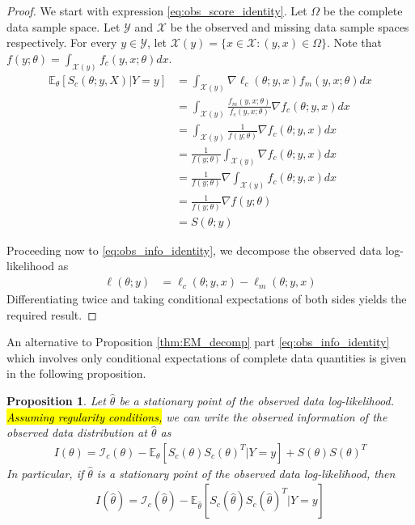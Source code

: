\documentclass[11pt, oneside]{article}   	%
\newcommand{\bE}{\mathbb{E}}
\newtheorem{proposition}{Proposition}[section]
\begin{document}
\begin{proof}
    We start with expression \ref{eq:obs_score_identity}. Let $\Omega$ be the complete data sample space. Let $\mathcal{Y}$ and $\mathcal{X}$ be the observed and missing data sample spaces respectively. For every $y \in \mathcal{Y}$, let $\mathcal{X}(y) = \{ x \in \mathcal{X}: (y,x) \in \Omega\}$. Note that $f(y; \theta) = \int_{\mathcal{X}(y)} f_c(y, x; \theta) dx$.
    \begin{align}
        \bE_\theta [S_c(\theta; y, X)|Y=y] &= \int_{\mathcal{X}(y)} \nabla \ell_c(\theta; y, x) f_m(y, x; \theta) dx \nonumber\\
        &= \int_{\mathcal{X}(y)} \frac{f_m(y, x; \theta)}{f_c(y, x; \theta)} \nabla f_c(\theta; y, x) dx \nonumber\\
        &= \int_{\mathcal{X}(y)} \frac{1}{f(y; \theta)} \nabla f_c(\theta; y, x) dx\nonumber\\
        &= \frac{1}{f(y; \theta)} \int_{\mathcal{X}(y)} \nabla f_c(\theta; y, x) dx\nonumber\\
        &= \frac{1}{f(y; \theta)} \nabla \int_{\mathcal{X}(y)} f_c(\theta; y, x) dx \nonumber\\
        &= \frac{1}{f(y; \theta)} \nabla f(y; \theta)\nonumber\\
        &= S(\theta; y) \nonumber
    \end{align}

    Proceeding now to \ref{eq:obs_info_identity}, we decompose the observed data log-likelihood as
    \begin{align*}
        \ell(\theta; y) &= \ell_c(\theta; y, x) - \ell_m(\theta; y, x)
    \end{align*}
    Differentiating twice and taking conditional expectations of both sides yields the required result.
\end{proof}

An alternative to Proposition \ref{thm:EM_decomp} part \ref{eq:obs_info_identity} which involves only conditional expectations of complete data quantities is given in the following proposition.

\begin{proposition}
    \label{thm:info_decomp}
    Let $\hat{\theta}$ be a stationary point of the observed data log-likelihood. \hl{Assuming regularity conditions,} we can write the observed information of the observed data distribution at $\hat{\theta}$ as
    \begin{align}
        I(\theta) = \mathcal{I}_c(\theta) - \bE_{\theta} [ S_c(\theta) S_c(\theta)^T | Y=y] + S(\theta) S(\theta)^T
    \end{align}
    In particular, if $\hat{\theta}$ is a stationary point of the observed data log-likelihood, then
    \begin{align}
        I(\hat{\theta}) = \mathcal{I}_c(\hat{\theta})  - \bE_{\hat{\theta}} [ S_c(\hat{\theta}) S_c(\hat{\theta})^T | Y=y]
    \end{align}
\end{proposition}
\end{document}
